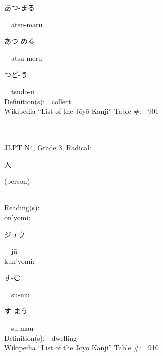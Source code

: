 \begin{multicols}{2}
{\hspace*{2em}}{\begin{CJK}{UTF8}{min} あつ-まる \end{CJK}}\ \ atsu-maru\ \ \\
{\hspace*{2em}}{\begin{CJK}{UTF8}{min} あつ-める \end{CJK}}\ \ atsu-meru\ \ \\
{\hspace*{2em}}{\begin{CJK}{UTF8}{min} つど-う \end{CJK}}\ \ tsudo-u\ \ \\
Definition(s):\ \ collect \\
Wikipedia ``List of the J\=oy\=o Kanji'' Table \#:\ \ 901 \\
\ \ \\
{\fontsize{34pt}{40pt}  }\ \ \\  %
{JLPT N4, Grade 3, Radical:\ \ {\begin{CJK}{UTF8}{min} 人 \end{CJK}} (person) } \\
Reading(s):\ \ \\
{\hspace*{1em}}on'yomi:\ \ \\
{\hspace*{2em}}{\begin{CJK}{UTF8}{min} ジュウ \end{CJK}}\ \ j\=u\ \ \\
{\hspace*{1em}}kun'yomi:\ \ \\
{\hspace*{2em}}{\begin{CJK}{UTF8}{min} す-む \end{CJK}}\ \ su-mu\ \ \\
{\hspace*{2em}}{\begin{CJK}{UTF8}{min} す-まう \end{CJK}}\ \ su-mau\ \ \\
Definition(s):\ \ dwelling \\
Wikipedia ``List of the J\=oy\=o Kanji'' Table \#:\ \ 910 \\
\ \ \\
{\fontsize{34pt}{40pt}  }\ \ \\  %

\end{multicols}

